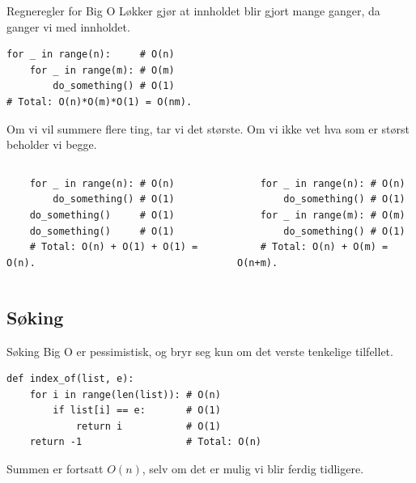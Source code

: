 \begin{frame}[fragile]{Regneregler for Big O}
    Løkker gjør at innholdet blir gjort mange ganger, da ganger vi med innholdet.
    \begin{verbatim}
for _ in range(n):     # O(n)
    for _ in range(m): # O(m)
        do_something() # O(1)
# Total: O(n)*O(m)*O(1) = O(nm).
    \end{verbatim}
    \pause
    Om vi vil summere flere ting, tar vi det største. Om vi ikke vet hva som er størst beholder vi begge.  
    \begin{columns}
        \begin{column}{0.45\textwidth}
            \begin{verbatim}
    for _ in range(n): # O(n)
        do_something() # O(1)
    do_something()     # O(1)
    do_something()     # O(1)
    # Total: O(n) + O(1) + O(1) = O(n).  
            \end{verbatim}
        \end{column}
        \pause
        \begin{column}{0.45\textwidth}
            \begin{verbatim}
    for _ in range(n): # O(n)
        do_something() # O(1)
    for _ in range(m): # O(m)
        do_something() # O(1)
    # Total: O(n) + O(m) = O(n+m).
            \end{verbatim}
            
        \end{column}
    \end{columns}
\end{frame}

\subsection{Søking}
\begin{frame}[fragile]{Søking}
    Big O er pessimistisk, og bryr seg kun om det verste tenkelige tilfellet.
    \begin{verbatim}
def index_of(list, e):
    for i in range(len(list)): # O(n)
        if list[i] == e:       # O(1)
            return i           # O(1)
    return -1                  # Total: O(n)
    \end{verbatim}
    Summen er fortsatt $O(n)$, selv om det er mulig vi blir ferdig tidligere.
\end{frame}

